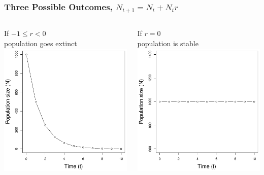 \documentclass[color=usenames,dvipsnames]{beamer}\usepackage[]{graphicx}\usepackage[]{xcolor}
\begin{document}
\begin{frame}
  \frametitle{Three Possible Outcomes, $N_{t+1} = N_t + N_tr$}
  \begin{columns}
    \begin{column}{0.33\textwidth}
      \small
      \centering
      If $-1 \leq r < 0$ \\ population goes extinct \\
      \includegraphics[width=\textwidth]{figs/rl0}
    \end{column}
    \begin{column}{0.33\textwidth}
      \small
      \centering
      If $r = 0$ \\ population is stable \\
      \includegraphics[width=\textwidth]{figs/r0}

\end{column}
\end{columns}
\end{frame}
\end{document}
